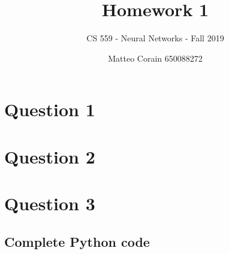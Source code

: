 \documentclass[letterpaper,headings=standardclasses]{scrartcl}
\title{Homework 1}
\subtitle{CS 559 - Neural Networks - Fall 2019}
\author{Matteo Corain 650088272}
\begin{document}
\maketitle

\section{Question 1}



\section{Question 2}



\section{Question 3}

\subsection{Complete Python code}


\end{document}
